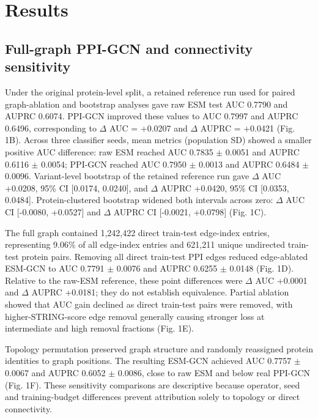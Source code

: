 \documentclass[conference]{IEEEtran}
\begin{document}
\section{Results}

\subsection{Full-graph PPI-GCN and connectivity sensitivity}

Under the original protein-level split, a retained reference run used for paired graph-ablation and bootstrap analyses gave raw ESM test AUC 0.7790 and AUPRC 0.6074. PPI-GCN improved these values to AUC 0.7997 and AUPRC 0.6496, corresponding to $\Delta$ AUC = +0.0207 and $\Delta$ AUPRC = +0.0421 (Fig. 1B). Across three classifier seeds, mean metrics (population SD) showed a smaller positive AUC difference: raw ESM reached AUC 0.7835 $\pm$ 0.0051 and AUPRC 0.6116 $\pm$ 0.0054; PPI-GCN reached AUC 0.7950 $\pm$ 0.0013 and AUPRC 0.6484 $\pm$ 0.0096. Variant-level bootstrap of the retained reference run gave $\Delta$ AUC +0.0208, 95\% CI [0.0174, 0.0240], and $\Delta$ AUPRC +0.0420, 95\% CI [0.0353, 0.0484]. Protein-clustered bootstrap widened both intervals across zero: $\Delta$ AUC CI [-0.0080, +0.0527] and $\Delta$ AUPRC CI [-0.0021, +0.0798] (Fig. 1C).

The full graph contained 1,242,422 direct train-test edge-index entries, representing 9.06\% of all edge-index entries and 621,211 unique undirected train-test protein pairs. Removing all direct train-test PPI edges reduced edge-ablated ESM-GCN to AUC 0.7791 $\pm$ 0.0076 and AUPRC 0.6255 $\pm$ 0.0148 (Fig. 1D). Relative to the raw-ESM reference, these point differences were $\Delta$ AUC +0.0001 and $\Delta$ AUPRC +0.0181; they do not establish equivalence. Partial ablation showed that AUC gain declined as direct train-test pairs were removed, with higher-STRING-score edge removal generally causing stronger loss at intermediate and high removal fractions (Fig. 1E).

Topology permutation preserved graph structure and randomly reassigned protein identities to graph positions. The resulting ESM-GCN achieved AUC 0.7757 $\pm$ 0.0067 and AUPRC 0.6052 $\pm$ 0.0086, close to raw ESM and below real PPI-GCN (Fig. 1F). These sensitivity comparisons are descriptive because operator, seed and training-budget differences prevent attribution solely to topology or direct connectivity.
\end{document}
